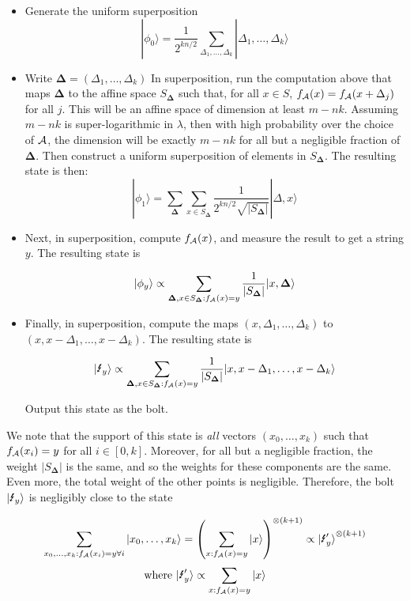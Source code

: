 \begin{itemize}
	\item Generate the uniform superposition
	\[|\phi_0\rangle=\frac{1}{2^{kn/2}}\sum_{\Delta_1,\dots,\Delta_k}|\Delta_1,\dots,\Delta_k\rangle\]
	\item Write $\mathbf{\Delta}=(\Delta_1,\dots,\Delta_k)$ In superposition, run the computation above that maps $\mathbf{\Delta}$ to the affine space $S_\mathbf{\Delta}$ such that, for all $x\in S$, $f_{\mathcal{A}}(x)=f_{\mathcal{A}}(x+\Delta_j)$ for all $j$.  This will be an affine space of dimension at least $m-nk$.  Assuming $m-nk$ is super-logarithmic in $\lambda$, then with high probability over the choice of ${\mathcal{A}}$, the dimension will be exactly $m-nk$ for all but a negligible fraction of $\mathbf{\Delta}$.  Then construct a uniform superposition of elements in $S_\mathbf{\Delta}$.  The resulting state is then:
	\[|\phi_1\rangle=\sum_{\mathbf{\Delta}}\sum_{x\in S_\mathbf{\Delta}}\frac{1}{2^{kn/2}\sqrt{|S_\mathbf{\Delta}|}}|\Delta,x\rangle\]
		
	\item Next, in superposition, compute $f_{\mathcal{A}}(x)$, and measure the result to get a string $y$.  The resulting state is
	
	\[|\phi_y\rangle\propto \sum_{\mathbf{\Delta},x\in S_\mathbf{\Delta}:f_{\mathcal{A}}(x)=y}\frac{1}{|S_\mathbf{\Delta}|}|x,\mathbf{\Delta}\rangle\]
	
	\item Finally, in superposition, compute the maps $(x,\Delta_1,\dots,\Delta_k)$ to $(x,x-\Delta_1,\dots,x-\Delta_k)$.  The resulting state is
	
	\[\qlightning[y]\propto\sum_{\mathbf{\Delta},x\in S_\mathbf{\Delta}:f_\As(x)=y}\frac{1}{|S_\mathbf{\Delta}|}|x,x-\Delta_1,\dots,x-\Delta_k\rangle\]
	
	Output this state as the bolt.
\end{itemize}

\begin{remark}\label{rem:1}We note that the support of this state is \emph{all} vectors $(x_0,\dots,x_k)$ such that $f_{\mathcal{A}}(x_i)=y$ for all $i\in[0,k]$.  Moreover, for all but a negligible fraction, the weight $|S_\mathbf{\Delta}|$ is the same, and so the weights for these components are the same.  Even more, the total weight of the other points is negligible.  Therefore, the bolt $\qlightning[y]$ is negligibly close to the state

\[\sum_{x_0,\dots,x_k:f_\As(x_i)=y\forall i}|x_0,\dots,x_k\rangle=\left(\sum_{x:f_\As(x)=y}|x\rangle\right)^{\otimes(k+1)}\propto\qlightningp[y]^{\otimes (k+1)}\]
 \[\text{where }\qlightningp[y]\propto\sum_{x:f_\As(x)=y}|x\rangle \]
\end{remark}

